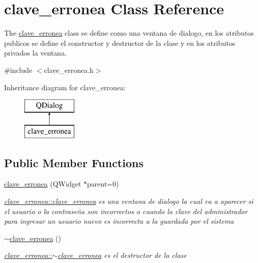 \hypertarget{classclave__erronea}{}\section{clave\+\_\+erronea Class Reference}
\label{classclave__erronea}


The \hyperlink{classclave__erronea}{clave\+\_\+erronea} class se define como una ventana de dialogo, en los atributos publicos se define el constructor y destructor de la clase y en los atributos privados la ventana.  




{\ttfamily \#include $<$clave\+\_\+erronea.\+h$>$}

Inheritance diagram for clave\+\_\+erronea\+:\begin{figure}[H]
\begin{center}
\leavevmode
\includegraphics[height=2.000000cm]{classclave__erronea}
\end{center}
\end{figure}
\subsection*{Public Member Functions}
\begin{DoxyCompactItemize}
\item 
\hyperlink{classclave__erronea_ac304b7fa422028fb2f4a63a0b18da520}{clave\+\_\+erronea} (Q\+Widget $\ast$parent=0)
\begin{DoxyCompactList}\small\item\em \hyperlink{classclave__erronea_ac304b7fa422028fb2f4a63a0b18da520}{clave\+\_\+erronea\+::clave\+\_\+erronea} es una ventana de dialogo la cual va a aparecer si el usuario o la contraseña son incorrectos o cuando la clave del administrador para ingresar un usuario nuevo es incorrecta a la guardada por el sistema \end{DoxyCompactList}\item 
\mbox{\label{classclave__erronea_a0c445695b22b66d7a4e24bad293cf5df}} 
\hyperlink{classclave__erronea_a0c445695b22b66d7a4e24bad293cf5df}{$\sim$clave\+\_\+erronea} ()
\begin{DoxyCompactList}\small\item\em \hyperlink{classclave__erronea_a0c445695b22b66d7a4e24bad293cf5df}{clave\+\_\+erronea\+::$\sim$clave\+\_\+erronea} es el destructor de la clase \end{DoxyCompactList}\end{DoxyCompactItemize}


